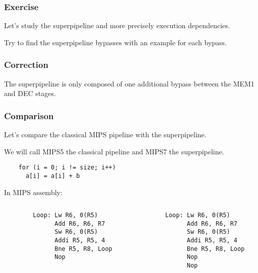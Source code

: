 
\begin{frame}
  \frametitle{Exercise}

  Let's study the superpipeline and more precisely execution dependencies.

  \-

  Try to find the superpipeline bypasses with an example for each bypass.
\end{frame}


\begin{frame}
  \frametitle{Correction}

  The superpipeline is only composed of one additional bypass between
  the MEM1 and DEC stages.

  \begin{center}
  \end{center}
\end{frame}


\begin{frame}[containsverbatim]
  \frametitle{Comparison}

  Let's compare the classical MIPS pipeline with the superpipeline.

  \-

  We will call MIPS5 the classical pipeline and MIPS7 the superpipeline.

  \begin{verbatim}
    for (i = 0; i != size; i++)
      a[i] = a[i] + b
  \end{verbatim}

  In MIPS assembly:

  \begin{columns}

    \begin{column}{6cm}
      \begin{verbatim}
        Loop: Lw R6, 0(R5)
              Add R6, R6, R7
              Sw R6, 0(R5)
              Addi R5, R5, 4
              Bne R5, R8, Loop
              Nop
      \end{verbatim}
    \end{column}

    \begin{column}{6cm}
      \begin{verbatim}
        Loop: Lw R6, 0(R5)
              Add R6, R6, R7
              Sw R6, 0(R5)
              Addi R5, R5, 4
              Bne R5, R8, Loop
              Nop
              Nop
      \end{verbatim}
    \end{column}
  \end{columns}
\end{frame}

